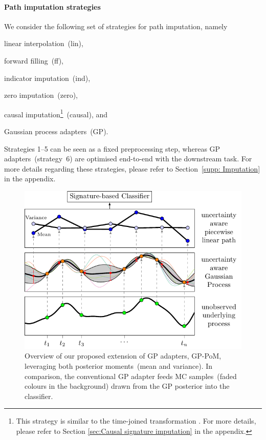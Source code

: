 \documentclass{article}
\begin{document}
\paragraph{Path imputation strategies}
We consider the following set of strategies for path imputation, namely
\begin{inparaenum}[(1)]
    \item linear interpolation~(lin),
    \item forward filling~(ff),
    \item indicator imputation~(ind),
    \item zero imputation~(zero),
    \item causal imputation\footnote{This strategy is similar to the
      time-joined transformation \citep{levin2013}. For more details,
    please refer to Section \ref{sec:Causal signature imputation} in the
  appendix.}~(causal), and
    \item Gaussian process adapters~(GP).
\end{inparaenum}
%
Strategies 1--5 can be seen as a fixed preprocessing step, whereas GP
adapters~(strategy~6) are optimised end-to-end with the downstream task. For more
details regarding these strategies, please refer to Section~\ref{supp: Imputation} in the
appendix.

\begin{figure}[t]
    \centering
    \hspace*{1cm}
    \includegraphics[width=0.7\columnwidth]{figures/overview.pdf}
    \caption{%
      Overview of our proposed extension of GP adapters, GP-PoM,
      leveraging both posterior moments~(mean and variance). In
      comparison, the conventional GP adapter feeds MC samples~(faded
      colours in the background) drawn from the GP posterior into the
      classifier.
    }
    \label{fig:overview}
\end{figure}
\end{document}

